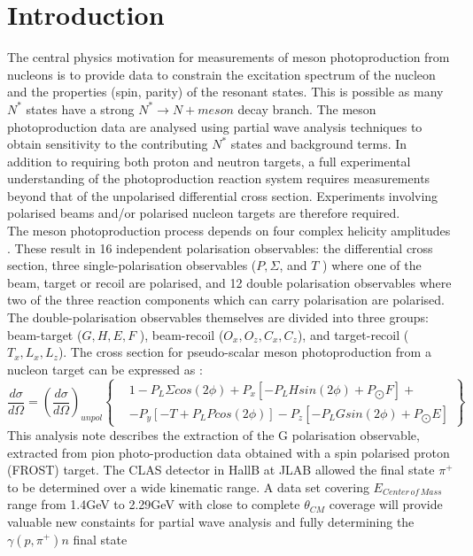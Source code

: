 \section{Introduction}
The central physics motivation for measurements of meson photoproduction from nucleons is to provide data to constrain the excitation spectrum of the nucleon and the properties (spin, parity) of the resonant states.  This is possible as many $N^*$ states have a strong $N^*\rightarrow N + meson$  decay branch.  The meson photoproduction data are analysed using partial wave analysis techniques to obtain sensitivity to the contributing $N^*$ states and background terms.
In addition to requiring both proton and neutron targets, a full experimental understanding of the photoproduction reaction system requires measurements
beyond that of the unpolarised differential cross section. Experiments involving polarised beams and/or polarised nucleon targets are therefore required. \\
The meson photoproduction process depends on four complex helicity amplitudes \cite{PhysRev.106.1337} \cite{PhysRev.106.1345}. These result in 16 independent polarisation observables: the differential cross section, three single-polarisation observables ($P, \Sigma$, and $T$ ) where one of the beam, target
or recoil are polarised, and 12 double polarisation observables where two of the three reaction components which can carry polarisation are polarised. The
double-polarisation observables themselves are divided into three groups: beam-target ($G, H, E, F$ ), beam-recoil ($O_x , O_z, C_x , C_z$), and target-recoil ($T_x , L_x , L_z$).
The cross section for pseudo-scalar meson photoproduction from a nucleon target can be expressed as \cite{Bark_1974}:
\begin{equation}
\frac{d\sigma}{d\Omega} = \left(\frac{d\sigma}{d\Omega} \right)_{unpol}  \left\{ 
\begin{aligned}
    & 1 - P_L \Sigma cos(2\phi) + P_x \left[-P_L H sin(2\phi) + P_{\bigodot}F\right] + \\
& -P_y \left[ -T +P_L P cos(2\phi)\right] -P_z \left[-P_L G sin(2\phi) + P_{\bigodot}E\right]
\end{aligned}
\right\} 
\label{eqn:CGLN}
\end{equation}
This analysis note describes the extraction of the G polarisation observable, extracted from pion photo-production data obtained with a spin polarised proton (FROST) target. The CLAS detector in HallB at JLAB allowed the final state $\pi^+$ to be determined over a wide kinematic range. A data set covering $E_{Center\, of\, Mass}$ range from 1.4GeV to 2.29GeV with close to complete $\theta_{CM}$ coverage will provide valuable new constaints for partial wave analysis and fully determining the $\gamma (p,\pi^+)n$ final state
